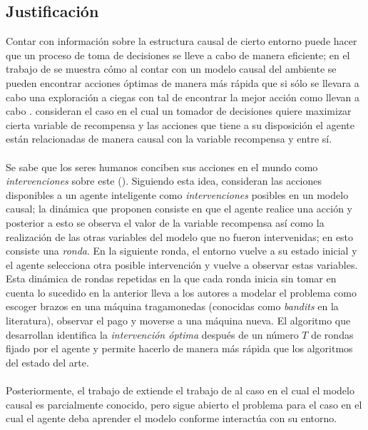 \documentclass[11pt]{article}
\theoremstyle{plain}
\begin{document}
\subsection{Justificación}
Contar con información sobre la estructura causal de cierto entorno puede hacer que un proceso de toma de decisiones se lleve a cabo de manera eficiente; en el trabajo de \cite{lattimoreNIPS2016} se muestra cómo al contar con un modelo causal del ambiente se pueden encontrar acciones óptimas de manera más rápida que si sólo se llevara a cabo una exploración a ciegas con tal de encontrar la mejor acción como llevan a cabo \cite{audibert2010best}. \cite{lattimoreNIPS2016} consideran el caso en el cual un tomador de decisiones quiere maximizar cierta variable de recompensa y las acciones que tiene a su disposición el agente están relacionadas de manera causal con la variable recompensa y entre sí.\\
\\
\indent Se sabe que los seres humanos conciben sus acciones en el mundo como \textit{intervenciones} sobre este (\cite{hagmayer2009decision}). Siguiendo esta idea,  \cite{lattimoreNIPS2016} consideran las acciones disponibles a un agente inteligente como \textit{intervenciones} posibles en un modelo causal; la dinámica que proponen consiste en que el agente realice una acción y posterior a esto se observa el valor de la variable recompensa así como la realización de las otras variables del modelo que no fueron intervenidas; en esto consiste una \textit{ronda}. En la siguiente ronda, el entorno vuelve a su estado inicial y el agente selecciona otra posible intervención y vuelve a observar estas variables. Esta dinámica de rondas repetidas en la que cada ronda inicia sin tomar en cuenta lo sucedido en la anterior lleva a los autores a modelar el problema como escoger brazos en una máquina tragamonedas (conocidas como \textit{bandits} en la literatura), observar el pago y moverse a una máquina nueva. El algoritmo que desarrollan identifica la \textit{intervención óptima} después de un número $T$ de rondas fijado por el agente y permite hacerlo de manera más rápida que los algoritmos del estado del arte.\\
\\
\indent Posteriormente, el trabajo de \cite{sen2017identifying} extiende el trabajo de \cite{lattimoreNIPS2016} al caso en el cual el modelo causal es parcialmente conocido, pero sigue abierto el problema para el caso en el cual el agente deba aprender el modelo conforme interactúa con su entorno.\\
\end{document}
